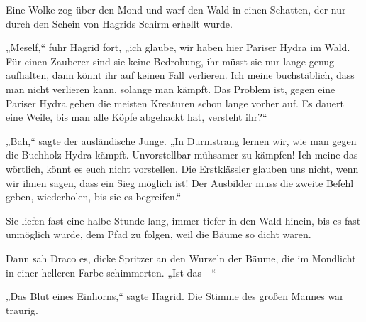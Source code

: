 Eine Wolke zog über den Mond und warf den Wald in einen Schatten, der nur durch den Schein von Hagrids Schirm erhellt wurde.

„Meself,“ fuhr Hagrid fort, „ich glaube, wir haben hier Pariser Hydra im Wald. Für einen Zauberer sind sie keine Bedrohung, ihr müsst sie nur lange genug aufhalten, dann könnt ihr auf keinen Fall verlieren. Ich meine buchstäblich, dass man nicht verlieren kann, solange man kämpft. Das Problem ist, gegen eine Pariser Hydra geben die meisten Kreaturen schon lange vorher auf. Es dauert eine Weile, bis man alle Köpfe abgehackt hat, versteht ihr?“

„Bah,“ sagte der ausländische Junge. „In Durmstrang lernen wir, wie man gegen die Buchholz-Hydra kämpft. Unvorstellbar mühsamer zu kämpfen! Ich meine das wörtlich, könnt es euch nicht vorstellen. Die Erstklässler glauben uns nicht, wenn wir ihnen sagen, dass ein Sieg möglich ist! Der Ausbilder muss die zweite Befehl geben, wiederholen, bis sie es begreifen.“%

Sie liefen fast eine halbe Stunde lang, immer tiefer in den Wald hinein, bis es fast unmöglich wurde, dem Pfad zu folgen, weil die Bäume so dicht waren.

Dann sah Draco es, dicke Spritzer an den Wurzeln der Bäume, die im Mondlicht in einer helleren Farbe schimmerten.
„Ist das—“

„Das Blut eines Einhorns,“ sagte Hagrid. Die Stimme des großen Mannes war traurig.

